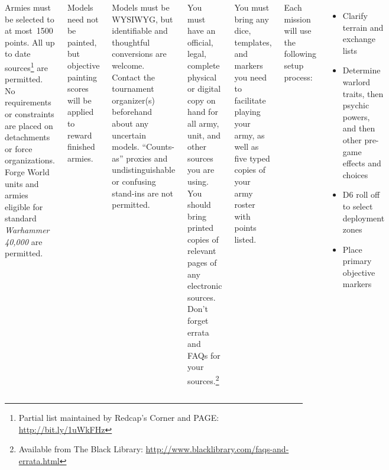 \clearpage
{}

\begin{columns}


Armies must be selected to at most~1500 points.  All up to date
sources\footnote{Partial list maintained by Redcap's Corner and PAGE:
  \url{http://bit.ly/1uWkFHz}} are permitted.  No requirements or
constraints are placed on detachments or force organizations.  Forge
World units and armies eligible for standard \emph{Warhammer 40,000}
are permitted.

Models need not be painted, but objective painting scores will be
applied to reward finished armies.

Models must be WYSIWYG, but identifiable and thoughtful conversions
are welcome.  Contact the tournament organizer(s) beforehand about any
uncertain models.  ``Counts-as'' proxies and undistinguishable or
confusing stand-ins are not permitted.


You must have an official, legal, complete physical or digital copy on
hand for all army, unit, and other sources you are using.  You should
bring printed copies of relevant pages of any electronic sources.
Don't forget errata and FAQs for your sources.\footnote{Available from
  The Black Library:
  \url{http://www.blacklibrary.com/faqs-and-errata.html}}

You must bring any dice, templates, and markers you need to facilitate
playing your army, as well as five typed copies of your army roster
with points listed.


Each mission will use the following setup process:

\begin{itemize}\shortlist
\item Clarify terrain and exchange lists

\item Determine warlord traits, then psychic powers, and then other
  pre-game effects and choices

\item D6 roll off to select deployment zones

\item Place primary objective markers


\end{itemize}
\end{columns}
